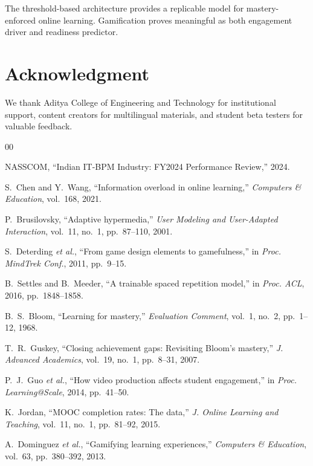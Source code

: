 \documentclass[conference]{IEEEtran}
\begin{document}
The threshold-based architecture provides a replicable model for mastery-enforced online learning. Gamification proves meaningful as both engagement driver and readiness predictor.

\section*{Acknowledgment}

We thank Aditya College of Engineering and Technology for institutional support, content creators for multilingual materials, and student beta testers for valuable feedback.

\begin{thebibliography}{00}

NASSCOM, ``Indian IT-BPM Industry: FY2024 Performance Review,'' 2024.

S.~Chen and Y.~Wang, ``Information overload in online learning,'' \emph{Computers \& Education}, vol.~168, 2021.

P.~Brusilovsky, ``Adaptive hypermedia,'' \emph{User Modeling and User-Adapted Interaction}, vol.~11, no.~1, pp.~87--110, 2001.

S.~Deterding \emph{et al.}, ``From game design elements to gamefulness,'' in \emph{Proc. MindTrek Conf.}, 2011, pp.~9--15.

B.~Settles and B.~Meeder, ``A trainable spaced repetition model,'' in \emph{Proc. ACL}, 2016, pp.~1848--1858.

B.~S.~Bloom, ``Learning for mastery,'' \emph{Evaluation Comment}, vol.~1, no.~2, pp.~1--12, 1968.

T.~R.~Guskey, ``Closing achievement gaps: Revisiting Bloom's mastery,'' \emph{J. Advanced Academics}, vol.~19, no.~1, pp.~8--31, 2007.

P.~J.~Guo \emph{et al.}, ``How video production affects student engagement,'' in \emph{Proc. Learning@Scale}, 2014, pp.~41--50.

K.~Jordan, ``MOOC completion rates: The data,'' \emph{J. Online Learning and Teaching}, vol.~11, no.~1, pp.~81--92, 2015.

A.~Dominguez \emph{et al.}, ``Gamifying learning experiences,'' \emph{Computers \& Education}, vol.~63, pp.~380--392, 2013.

\end{thebibliography}
\end{document}
